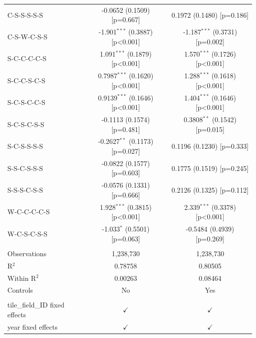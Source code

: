 \begin{table}[H]
\begin{tabular}{lcc}
      C-S-S-S-S-S                     & -0.0652 (0.1509) [p=0.667]        & 0.1972 (0.1480) [p=0.186]\\   
      C-S-W-C-S-S                     & -1.901$^{***}$ (0.3887) [p<0.001] & -1.187$^{***}$ (0.3731) [p=0.002]\\   
      S-C-C-C-C-S                     & 1.091$^{***}$ (0.1879) [p<0.001]  & 1.570$^{***}$ (0.1726) [p<0.001]\\   
      S-C-C-S-C-S                     & 0.7987$^{***}$ (0.1620) [p<0.001] & 1.288$^{***}$ (0.1618) [p<0.001]\\   
      S-C-S-C-C-S                     & 0.9139$^{***}$ (0.1646) [p<0.001] & 1.404$^{***}$ (0.1646) [p<0.001]\\   
      S-C-S-C-S-S                     & -0.1113 (0.1574) [p=0.481]        & 0.3808$^{**}$ (0.1542) [p=0.015]\\   
      S-C-S-S-S-S                     & -0.2627$^{**}$ (0.1173) [p=0.027] & 0.1196 (0.1230) [p=0.333]\\   
      S-S-C-S-S-S                     & -0.0822 (0.1577) [p=0.603]        & 0.1775 (0.1519) [p=0.245]\\   
      S-S-S-C-S-S                     & -0.0576 (0.1331) [p=0.666]        & 0.2126 (0.1325) [p=0.112]\\   
      W-C-C-C-C-S                     & 1.928$^{***}$ (0.3815) [p<0.001]  & 2.339$^{***}$ (0.3378) [p<0.001]\\   
      W-C-S-C-S-S                     & -1.033$^{*}$ (0.5501) [p=0.063]   & -0.5484 (0.4939) [p=0.269]\\   
       \\
      Observations                    & 1,238,730               & 1,238,730\\  
      R$^2$                           & 0.78758                 & 0.80505\\  
      Within R$^2$                    & 0.00263                 & 0.08464\\  
      Controls                        & No                      & Yes\\  
       \\
      tile\_field\_ID fixed effects   & $\checkmark$            & $\checkmark$\\   
      year fixed effects              & $\checkmark$            & $\checkmark$\\   
      \bottomrule
   \end{tabular}
\end{table}



